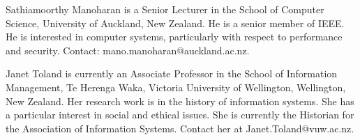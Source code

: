 \documentclass{IEEEcsmag}
\begin{document}
\begin{IEEEbiography}{Sathiamoorthy Manoharan} is a Senior Lecturer in the School of Computer Science, University of Auckland, New Zealand.
He is a senior member of IEEE. He is interested in computer systems, particularly with respect to performance and security. Contact: mano.manoharan@auckland.ac.nz.\vspace*{8pt}
\end{IEEEbiography}

\begin{IEEEbiography}{Janet Toland} is currently an Associate Professor in the
School of Information Management, Te Herenga Waka, Victoria
University of Wellington, Wellington, New Zealand. Her
research work is in the history of information systems. She
has a particular interest in social and ethical issues. She is
currently the Historian for the Association of Information
Systems. Contact her at Janet.Toland@vuw.ac.nz.\vspace*{8pt}
\end{IEEEbiography}
\end{document}
